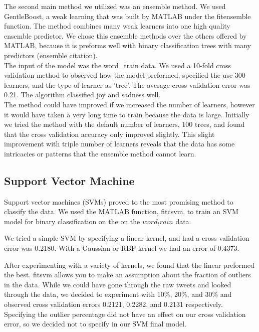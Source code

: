 \documentclass[]{article}
\begin{document}
The second main method we utilized was an ensemble method. We used GentleBoost, a weak learning that was built by MATLAB under the fitensemble function. The method combines many weak learners into one high quality ensemble predictor. We chose this ensemble methods over the others offered by MATLAB, because it is preforms well with binary classification trees with many predictors (ensemble citation). \\

The input of the model was the word\_train data. We used a 10-fold cross validation method to observed how the model preformed, specified the use 300 learners, and the type of learner as 'tree'. The average cross validation error was 0.21. The algorithm classified joy and sadness well. \\

The method could have improved if we increased the number of learners, however it would have taken a very long time to train because the data is large. Initially we tried the method with the default number of learners, 100 trees, and found that the cross validation accuracy only improved slightly. This slight improvement with triple number of learners reveals that the data has some intricacies or patterns that the ensemble method cannot learn.   


\subsection{Support Vector Machine}

Support vector machines (SVMs) proved to the most promising method to classify the data. We used the MATLAB function, fitcsvm, to train an SVM model for binary classification on the on the $word_train$ data.

We tried a simple SVM by specifying a linear kernel, and had a  cross validation error was 0.2180. With a Gaussian or RBF kernel we had an error of 0.4373. 


After experimenting with a variety of kernels, we found that the linear preformed the best. fitsvm allows you to make an assumption about the fraction of outliers in the data. While we could have gone through the raw tweets and looked through the data, we decided to experiment with  10\%, 20\%, and 30\% and observed cross validation errors 0.2121, 0.2282, and 0.2131 respectively. Specifying the outlier percentage did not have an effect on our cross validation error, so we decided not to specify in our SVM final model. 
\end{document}
